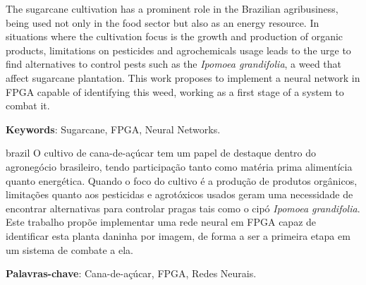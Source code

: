 \documentclass[
	12pt,				%
	oneside,			%
	a4paper,			%
	brazil,			    %
	french,				%
	spanish,			%
	english,			%
	]{abntex2}
\begin{document}

\frenchspacing


\imprimircapa

\imprimirfolhaderosto



\begin{resumo}
  The sugarcane cultivation has a prominent role in the Brazilian agribusiness, being used not only in the food sector but also as an energy resource. In situations where the cultivation focus is the growth and production of organic products, limitations on pesticides and agrochemicals usage leads to the urge to find alternatives to control pests such as the \textit{Ipomoea grandifolia}, a weed that affect sugarcane plantation. This work proposes to implement a neural network in FPGA capable of identifying this weed, working as a first stage of a system to combat it.

   \vspace{\onelineskip}
 
   \noindent 
   \textbf{Keywords}: Sugarcane, FPGA, Neural Networks.
\end{resumo}


\setlength{\absparsep}{18pt} %
\begin{resumo}[Resumo]
\begin{otherlanguage*}{brazil}
 O cultivo de cana-de-açúcar tem um papel de destaque dentro do agronegócio brasileiro, tendo participação tanto como matéria prima alimentícia quanto energética. Quando o foco do cultivo é a produção de produtos orgânicos, limitações quanto aos pesticidas e agrotóxicos usados geram uma necessidade de encontrar alternativas para controlar pragas tais como o cipó \textit{Ipomoea grandifolia}. Este trabalho propõe implementar uma rede neural em FPGA capaz de identificar esta planta daninha por imagem, de forma a ser a primeira etapa em um sistema de combate a ela.

 \textbf{Palavras-chave}: Cana-de-açúcar, FPGA, Redes Neurais.
  \end{otherlanguage*}
\end{resumo}
\end{document}
